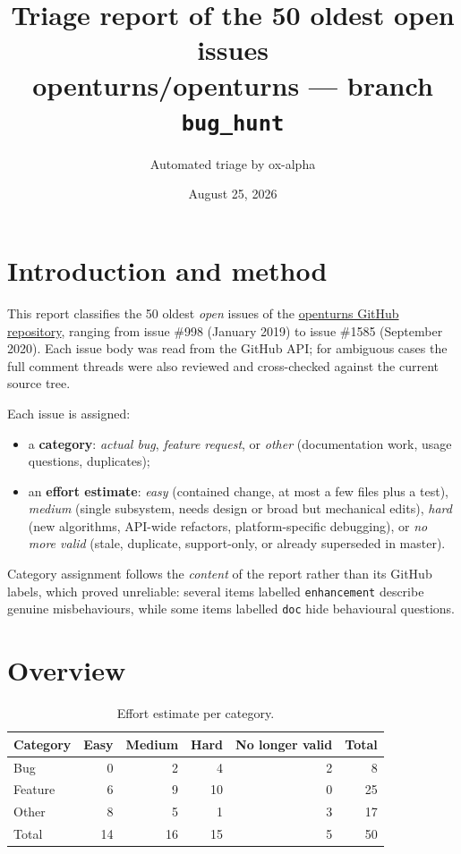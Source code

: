 \documentclass[a4paper,11pt]{article}
\title{Triage report of the 50 oldest open issues\\ \large openturns/openturns --- branch \texttt{bug\_hunt}}
\author{Automated triage by ox-alpha}
\date{August 25, 2026}
\begin{document}
\maketitle

\section{Introduction and method}

This report classifies the 50 oldest \emph{open} issues of the
\href{https://github.com/openturns/openturns/issues}{openturns GitHub repository},
ranging from issue \#998 (January 2019) to issue \#1585 (September 2020).
Each issue body was read from the GitHub API; for ambiguous cases the full
comment threads were also reviewed and cross-checked against the current
source tree.

Each issue is assigned:
\begin{itemize}[noitemsep]
  \item a \textbf{category}: \emph{actual bug}, \emph{feature request}, or
        \emph{other} (documentation work, usage questions, duplicates);
  \item an \textbf{effort estimate}: \emph{easy} (contained change, at most a
        few files plus a test), \emph{medium} (single subsystem, needs design or
        broad but mechanical edits), \emph{hard} (new algorithms, API-wide
        refactors, platform-specific debugging), or \emph{no more valid}
        (stale, duplicate, support-only, or already superseded in master).
\end{itemize}

Category assignment follows the \emph{content} of the report rather than its
GitHub labels, which proved unreliable: several items labelled
\texttt{enhancement} describe genuine misbehaviours, while some items labelled
\texttt{doc} hide behavioural questions.

\section{Overview}

\begin{table}[h]
\centering
\caption{Effort estimate per category.}
\begin{tabular}{lrrrrr}
\toprule
Category & Easy & Medium & Hard & No longer valid & Total \\
\midrule
Bug & 0 & 2 & 4 & 2 & 8 \\
Feature & 6 & 9 & 10 & 0 & 25 \\
Other & 8 & 5 & 1 & 3 & 17 \\
\midrule
Total & 14 & 16 & 15 & 5 & 50 \\
\bottomrule
\end{tabular}
\end{table}
\end{document}
